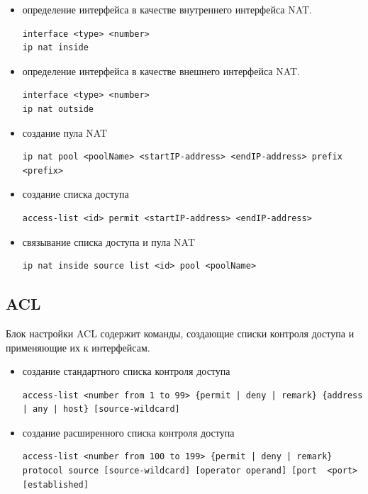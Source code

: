 \begin{itemize}
	\item определение интерфейса в качестве внутреннего интерфейса NAT.
	
	
\begin{lstlisting}
interface <type> <number>
ip nat inside
\end{lstlisting}

	\item определение интерфейса в качестве внешнего интерфейса NAT.
	
	
\begin{lstlisting}
interface <type> <number>
ip nat outside
\end{lstlisting}

\item  создание пула NAT 

\begin{lstlisting}
ip nat pool <poolName> <startIP-address> <endIP-address> prefix <prefix>
\end{lstlisting}

\item создание списка доступа

\begin{lstlisting}
access-list <id> permit <startIP-address> <endIP-address>
\end{lstlisting}

\item связывание списка доступа и пула NAT

\begin{lstlisting}
ip nat inside source list <id> pool <poolName>
\end{lstlisting}
\end{itemize}

\subsection{ACL}

Блок настройки ACL содержит команды, создающие списки контроля доступа и применяющие их к интерфейсам.

\begin{itemize}
	\item создание стандартного списка контроля доступа
	
\begin{lstlisting}
access-list <number from 1 to 99> {permit | deny | remark} {address | any | host} [source-wildcard]
\end{lstlisting}

\item создание расширенного списка контроля доступа

\begin{lstlisting}
access-list <number from 100 to 199> {permit | deny | remark} protocol source [source-wildcard] [operator operand] [port  <port> [established]
\end{lstlisting}
\end{itemize}


